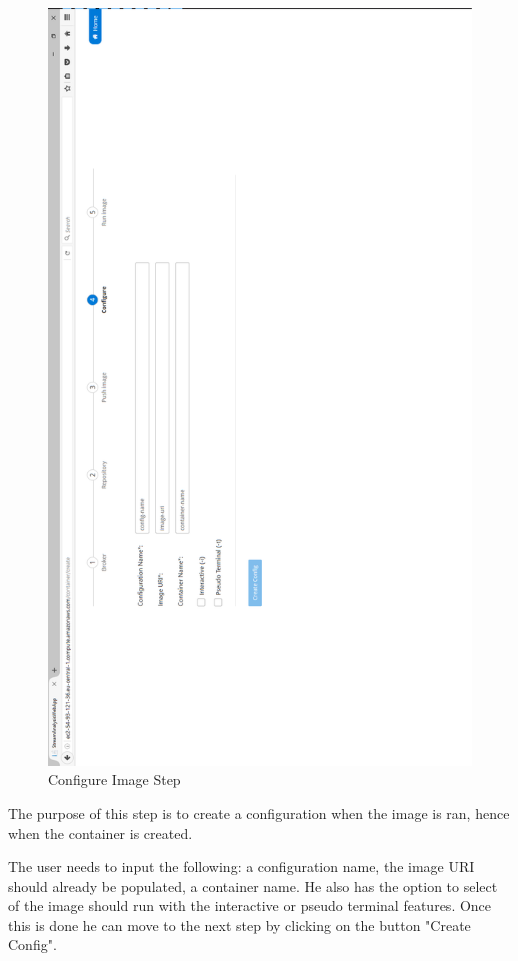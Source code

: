 \begin{figure}[p]
	\centering
	\noindent
	\includegraphics[width=0.5\paperwidth]{./images/guide/container/configure.PNG}
	\caption{Configure Image Step}
	\label{fig:configure}
\end{figure}

The purpose of this step is to create a configuration when the image is ran, hence when the container is created.

The user needs to input the following: a configuration name, the image URI should already be populated, a container name. He also has the option to select of the image should run with the interactive or pseudo terminal features. Once this is done he can move to the next step by clicking on the button "Create Config".

